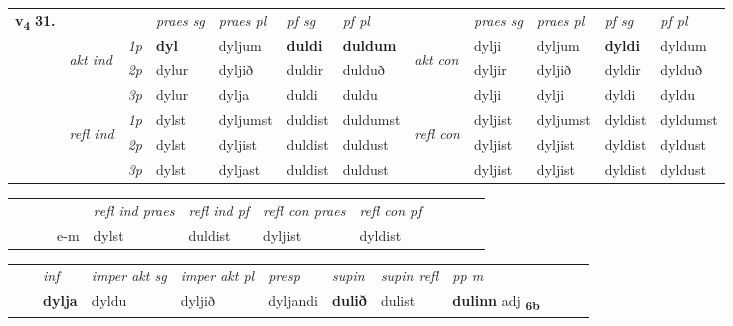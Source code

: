 \begin{tabular}{llllllllllll} \toprule
\multirow{4}{*}{{{\textbf{v{\textsubscript{4}}} \Large{\textbf{31.}}}}}  & &   &  \textit{praes sg}  & \textit{praes pl}  &\textit{ pf sg} & \textit{pf pl} &  &  \textit{praes sg}  & \textit{praes pl}  & \textit{pf sg} & \textit{pf pl } \\*
	\cmidrule{4-7} \cmidrule{9-12}
 & \multirow{3}{*}{\begin{turn}{90}\textit{akt ind}\end{turn}} & {\textit{1p}} & \textbf{dyl} & dyljum    & \textbf{duldi} & \textbf{duldum} & \multirow{3}{*}{\begin{turn}{90}\textit{akt con}\end{turn}} &dylji & dyljum & \textbf{dyldi} & dyldum\\*
& &  {\textit{2p}} &  dylur  & dyljið   & duldir & dulduð & & dyljir & dyljið & dyldir & dylduð \\*
& &  {\textit{3p}} & dylur & dylja   & duldi & duldu & & dylji & dylji& dyldi & dyldu  \\*
\cmidrule{4-7} \cmidrule{9-12}
 &\multirow{3}{*}{\begin{turn}{90}\textit{refl ind}\end{turn}} & {\textit{1p}} & dylst & dyljumst    & duldist & duldumst & \multirow{3}{*}{\begin{turn}{90}\textit{refl con}\end{turn}}  &dyljist & dyljumst & dyldist & dyldumst\\*
 &&  {\textit{2p}} &  dylst  & dyljist   & duldist & duldust & &dyljist & dyljist & dyldist & dyldust \\*
& &  {\textit{3p}} & dylst & dyljast   & duldist & duldust & & dyljist & dyljist& dyldist & dyldust  \\*
\cmidrule{4-7} \cmidrule{9-12}
\end{tabular}


\begin{tabular}{llllllllllll}
 & &  & &  \textit{refl ind praes} & \textit{refl ind pf} & \textit{refl con praes} & \textit{refl con pf} \\*
&  & & e-m & dylst & duldist & dyljist & dyldist \\*
\cmidrule{5-9}
\end{tabular}


\begin{tabular}{llllllllllll}
 & & \textit{inf} & \textit{imper akt sg} & \textit{imper akt pl}   & \textit{presp} & \textit{supin} & \textit{supin refl} & \textit{pp m}     \\*
  & & \textbf{dylja} & dyldu  & dyljið   & dyljandi &  \textbf{dulið} & dulist & \textbf{dulinn} adj \textbf{\textsubscript{6b}} \\*
\cmidrule{1-12}
\end{tabular}



